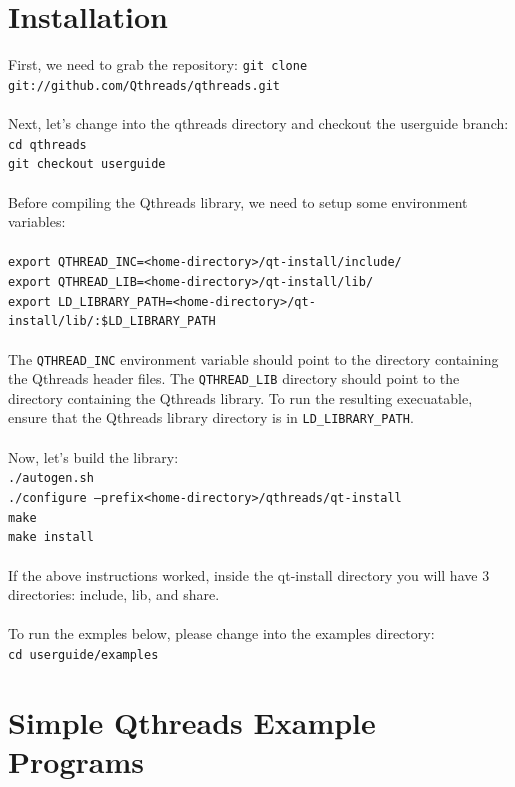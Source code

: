\documentclass[12pt,fullpage]{article}
\begin{document}
\section{Installation}
First, we need to grab the repository:
{\footnotesize{\tt git clone git://github.com/Qthreads/qthreads.git}}
\\ \\
Next, let's change into the qthreads directory and checkout the userguide branch:
\\
{\footnotesize{\tt cd qthreads}}
\\
{\footnotesize{\tt git checkout userguide}}
\\ \\
Before compiling the Qthreads library, we need to setup some environment variables:
\\ \\
{\footnotesize{\tt export QTHREAD\_INC=<home-directory>/qt-install/include/}}
\\
{\footnotesize{\tt export QTHREAD\_LIB=<home-directory>/qt-install/lib/}}
\\
{\footnotesize{\tt export LD\_LIBRARY\_PATH=<home-directory>/qt-install/lib/:\$LD\_LIBRARY\_PATH}}
\\ \\
The {\tt QTHREAD\_INC} environment variable should point to the directory containing the Qthreads header files.  The {\tt QTHREAD\_LIB} directory should point to the directory containing the Qthreads library.  To run the resulting execuatable, ensure that the Qthreads library directory is in {\tt LD\_LIBRARY\_PATH}.
\\ \\
Now, let's build the library: 
\\
{\footnotesize{\tt ./autogen.sh}}
\\
{\footnotesize{\tt ./configure --prefix<home-directory>/qthreads/qt-install}}
\\
{\footnotesize{\tt make}}
\\
{\footnotesize{\tt make install}}
\\ \\
If the above instructions worked, inside the qt-install directory you will have 3 directories: include, lib, and share.
\\ \\ 
To run the exmples below, please change into the examples directory:
\\
{\footnotesize{\tt cd userguide/examples}}

\section{Simple Qthreads Example Programs}
\end{document}
